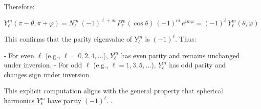 \documentclass[10pt]{article}
\begin{document}
\begin{solu}
\begin{small}
Therefore:

\[ Y_\ell^m(\pi - \theta, \pi + \varphi) = N_\ell^m \, (-1)^{\ell + m} \, P_\ell^m(\cos \theta) \, (-1)^m \, e^{i m \varphi} = (-1)^\ell \, Y_\ell^m(\theta, \varphi) \]

This confirms that the parity eigenvalue of \( Y_\ell^m \) is \( (-1)^\ell \). Thus:

- For even \( \ell \) (e.g., \( \ell = 0, 2, 4, \ldots \)), \( Y_\ell^m \) has even parity and remains unchanged under inversion.
- For odd \( \ell \) (e.g., \( \ell = 1, 3, 5, \ldots \)), \( Y_\ell^m \) has odd parity and changes sign under inversion.

This explicit computation aligns with the general property that spherical harmonics \( Y_\ell^m \) have parity \( (-1)^\ell \).
\qedsymbol.
\end{small}
\end{solu}
\end{document}
